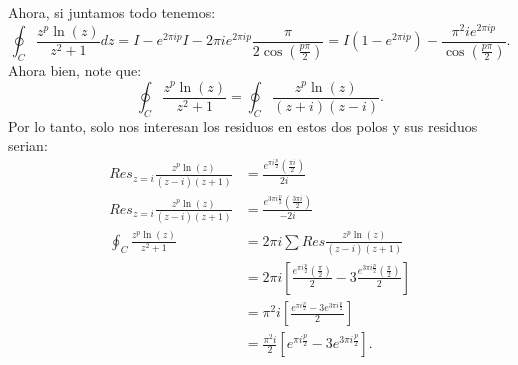\documentclass{report}
\begin{document}
Ahora, si juntamos todo tenemos: \[
  \oint_{C} \frac{z^{p}\ln\left( z \right) }{z^2 + 1}dz = I -e^{2\pi i p}I - 2\pi ie^{2 \pi i p}\frac{\pi}{2\cos\left( \frac{p\pi}{2} \right) } = I\left( 1 - e^{2\pi i p} \right) - \frac{\pi^2ie^{2\pi ip}}{\cos\left( \frac{p\pi}{2} \right) }
  .\] Ahora bien, note que: \[
  \oint_{C} \frac{z^{p}\ln\left( z \right) }{z^2 + 1} = \oint_{C} \frac{z^{p}\ln\left( z \right) }{\left( z + i \right) \left( z - i \right) }  
  .\] Por lo tanto, solo nos interesan los residuos en estos dos polos y sus residuos serian:
\begin{align*}
  Res_{z = i} \frac{z^{p}\ln\left( z \right) }{\left( z - i \right) \left( z + 1 \right) } &= \frac{e^{\pi i \frac{p}{2}}\left( \frac{\pi i}{2} \right) }{2i} \\
  Res_{z = i} \frac{z^{p}\ln\left( z \right) }{\left( z - i \right) \left( z + 1 \right) } &= \frac{e^{3\pi i \frac{p}{2}}\left( \frac{3\pi i}{2} \right) }{-2i} \\
  \oint_{C} \frac{z^{p}\ln\left( z \right) }{z^2 + 1} &= 2\pi i \sum Res \frac{z^{p}\ln\left( z \right) }{\left( z - i \right) \left( z + 1 \right) } \\
  &= 2\pi i \left[ \frac{e^{\pi i \frac{p}{2}}\left( \frac{\pi }{2} \right) }{2} - 3\frac{e^{3\pi i \frac{p}{2}}\left( \frac{\pi }{2} \right) }{2}\right]  \\
  &= \pi^2 i \left[ \frac{e^{\pi i \frac{p}{2}} - 3e^{3\pi i \frac{p}{2}}}{2} \right]  \\
  &= \frac{\pi^2 i}{2}\left[ e^{\pi i \frac{p}{2}} - 3e^{3\pi i \frac{p}{2}} \right]
.\end{align*}
\end{document}
